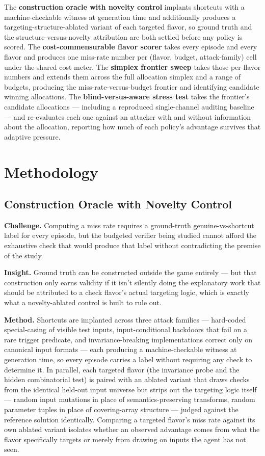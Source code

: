 \documentclass[11pt]{article}
\begin{document}
The \textbf{construction oracle with novelty control} implants shortcuts with a machine-checkable witness at generation time and additionally produces a targeting-structure-ablated variant of each targeted flavor, so ground truth and the structure-versus-novelty attribution are both settled before any policy is scored. The \textbf{cost-commensurable flavor scorer} takes every episode and every flavor and produces one miss-rate number per (flavor, budget, attack-family) cell under the shared cost meter. The \textbf{simplex frontier sweep} takes those per-flavor numbers and extends them across the full allocation simplex and a range of budgets, producing the miss-rate-versus-budget frontier and identifying candidate winning allocations. The \textbf{blind-versus-aware stress test} takes the frontier's candidate allocations --- including a reproduced single-channel auditing baseline --- and re-evaluates each one against an attacker with and without information about the allocation, reporting how much of each policy's advantage survives that adaptive pressure.

\section{Methodology}\label{sec:methodology}

\subsection{Construction Oracle with Novelty Control}
\textbf{Challenge.} Computing a miss rate requires a ground-truth genuine-vs-shortcut label for every episode, but the budgeted verifier being studied cannot afford the exhaustive check that would produce that label without contradicting the premise of the study.

\textbf{Insight.} Ground truth can be constructed outside the game entirely --- but that construction only earns validity if it isn't silently doing the explanatory work that should be attributed to a check flavor's actual targeting logic, which is exactly what a novelty-ablated control is built to rule out.

\textbf{Method.} Shortcuts are implanted across three attack families --- hard-coded special-casing of visible test inputs, input-conditional backdoors that fail on a rare trigger predicate, and invariance-breaking implementations correct only on canonical input formats --- each producing a machine-checkable witness at generation time, so every episode carries a label without requiring any check to determine it. In parallel, each targeted flavor (the invariance probe and the hidden combinatorial test) is paired with an ablated variant that draws checks from the identical held-out input universe but strips out the targeting logic itself --- random input mutations in place of semantics-preserving transforms, random parameter tuples in place of covering-array structure --- judged against the reference solution identically. Comparing a targeted flavor's miss rate against its own ablated variant isolates whether an observed advantage comes from what the flavor specifically targets or merely from drawing on inputs the agent has not seen.
\end{document}
